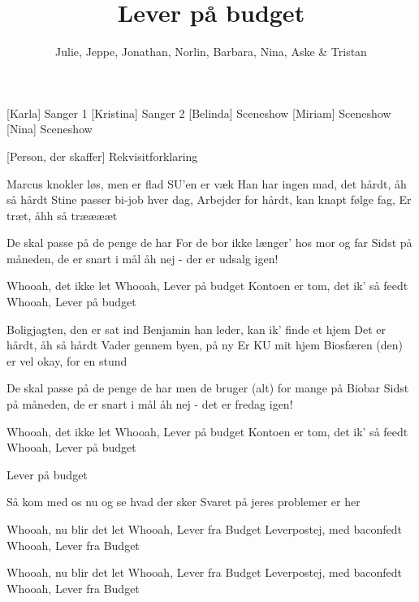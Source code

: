 \documentclass[a4paper,11pt]{article}
\title{Lever på budget}
\author{Julie, Jeppe, Jonathan, Norlin, Barbara, Nina, Aske \& Tristan}
\begin{document}
\maketitle

\begin{roles}
    [Karla] Sanger 1
    [Kristina] Sanger 2
    [Belinda] Sceneshow
    [Miriam] Sceneshow
    [Nina] Sceneshow
\end{roles}

\begin{props}
    [Person, der skaffer] Rekvisitforklaring
\end{props}

\begin{song}
Marcus knokler løs, men er flad
SU’en er væk
Han har ingen mad, det hårdt, åh så hårdt
Stine passer bi-job hver dag,
Arbejder for hårdt, kan knapt følge fag,
Er træt, åhh så trææææt
 
De skal passe på de penge de har
For de bor ikke længer’ 
hos mor og far
Sidst på måneden, de er snart i mål
åh nej - der er udsalg igen! 

Whooah, det ikke let
Whooah, Lever på budget
Kontoen er tom, det ik’ så feedt
Whooah, Lever på budget 

Boligjagten, den er sat ind 
Benjamin han leder, kan ik’ finde et hjem
Det er hårdt, åh så hårdt
Vader gennem byen, på ny
Er KU mit hjem
Biosfæren (den) er vel okay, for en stund

De skal passe på de penge de har
men de bruger (alt) for mange 
på Biobar
Sidst på måneden, de er snart i mål
åh nej - det er fredag igen! 

 Whooah, det ikke let
Whooah, Lever på budget
Kontoen er tom, det ik’ så feedt
Whooah, Lever på budget 

 Lever på budget

 Så kom med os nu og se hvad der sker
Svaret på jeres problemer er her

 Whooah, nu blir det let
Whooah, Lever fra Budget
Leverpostej, med baconfedt
Whooah, Lever fra Budget

 Whooah, nu blir det let
Whooah, Lever fra Budget
Leverpostej, med baconfedt
Whooah, Lever fra Budget

\end{song}
\end{document}
